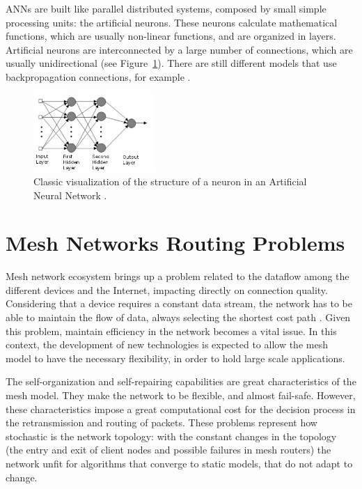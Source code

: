\documentclass[10pt, conference, compsocconf]{IEEEtran}
\begin{document}
ANNs are built like parallel distributed systems, composed by small simple processing units: the artificial neurons. These neurons calculate mathematical functions, which are usually non-linear functions, and are organized in layers. Artificial neurons are interconnected by a large number of connections, which are usually unidirectional (see Figure~\ref{fig:rna_visao_classica}). There are still different models that use backpropagation connections, for example \cite{Simon:2001}.

\begin{figure}[h]
	\centering
	\includegraphics[width=0.4\textwidth]{./graphics/rna_visao_classica_hopfield_en.jpg}
    \caption{ Classic visualization of the structure of a neuron in an Artificial Neural Network \cite{Braga:2007}.}
    \label{fig:rna_visao_classica}
\end{figure}

\section{Mesh Networks Routing Problems}\label{sec:routing}

Mesh network ecosystem brings up a problem related to the dataflow among the different devices and the Internet, impacting directly on connection quality. Considering that a device requires a constant data stream, the network has to be able to maintain the flow of data, always selecting the shortest cost path \cite{Baransel:386051}. Given this problem, maintain efficiency in the network becomes a vital issue. In this context, the development of new technologies is expected to allow the mesh model to have the necessary flexibility, in order to hold large scale applications.

The self-organization and self-repairing capabilities are great characteristics of the mesh model. They make the network to be flexible, and almost fail-safe. However, these characteristics impose a great computational cost for the decision process in the retransmission and routing of packets. These problems represent how stochastic is the network topology: with the constant changes in the topology (the entry and exit of client nodes and possible failures in mesh routers) the network unfit for algorithms that converge to static models, that do not adapt to change.
\end{document}
